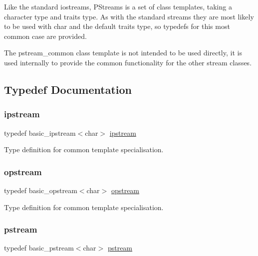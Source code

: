 Like the standard iostreams, P\+Streams is a set of class templates, taking a character type and traits type. As with the standard streams they are most likely to be used with {\ttfamily char} and the default traits type, so typedefs for this most common case are provided.

The {\ttfamily pstream\+\_\+common} class template is not intended to be used directly, it is used internally to provide the common functionality for the other stream classes. 

\subsection{Typedef Documentation}
\mbox{\label{namespaceredi_ac615c484a62785daa22c528ed96045e6}} 
\subsubsection{\texorpdfstring{ipstream}{ipstream}}
{\footnotesize\ttfamily typedef basic\+\_\+ipstream$<$char$>$ \mbox{\hyperlink{namespaceredi_ac615c484a62785daa22c528ed96045e6}{ipstream}}}



Type definition for common template specialisation. 

\mbox{\label{namespaceredi_afdfd2eccec7c6badbbc1cd16d2ff60fd}} 
\subsubsection{\texorpdfstring{opstream}{opstream}}
{\footnotesize\ttfamily typedef basic\+\_\+opstream$<$char$>$ \mbox{\hyperlink{namespaceredi_afdfd2eccec7c6badbbc1cd16d2ff60fd}{opstream}}}



Type definition for common template specialisation. 

\mbox{\label{namespaceredi_a85c3ba20ca5244e214138372b3a61c35}} 
\subsubsection{\texorpdfstring{pstream}{pstream}}
{\footnotesize\ttfamily typedef basic\+\_\+pstream$<$char$>$ \mbox{\hyperlink{namespaceredi_a85c3ba20ca5244e214138372b3a61c35}{pstream}}}



